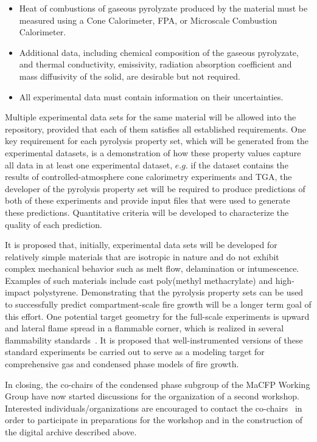 \begin{itemize}
\item Heat of combustions of gaseous pyrolyzate produced by the material must be measured using a Cone Calorimeter, FPA, or Microscale Combustion Calorimeter.
\item Additional data, including chemical composition of the gaseous pyrolyzate, and thermal conductivity, emissivity, radiation absorption coefficient and mass diffusivity of the solid, are desirable but not required.
\item All experimental data must contain information on their uncertainties.
\end{itemize}

Multiple experimental data sets for the same material will be allowed into the repository, provided that each of them satisfies all established requirements.  One key requirement for each pyrolysis property set, which will be generated from the experimental datasets, is a demonstration of how these property values capture all data in at least one experimental dataset, $e.g.$ if the dataset contains the results of controlled-atmosphere cone calorimetry experiments and TGA, the developer of the pyrolysis property set will be required to produce predictions of both of these experiments and provide input files that were used to generate these predictions.  Quantitative criteria will be developed to characterize the quality of each prediction. 

It is proposed that, initially, experimental data sets will be developed for relatively simple materials that are isotropic in nature and do not exhibit complex mechanical behavior such as melt flow, delamination or intumescence.  Examples of such materials include cast poly(methyl methacrylate) and high-impact polystyrene.  Demonstrating that the pyrolysis property sets can be used to successfully predict compartment-scale fire growth will be a longer term goal of this effort.  One potential target geometry for the full-scale experiments is upward and lateral flame spread in a flammable corner, which is realized in several flammability standards~\cite{NFPA,EN,ISO}.  It is proposed that well-instrumented versions of these standard experiments be carried out to serve as a modeling target for comprehensive gas and condensed phase models of fire growth.

In closing, the co-chairs of the condensed phase subgroup of the MaCFP Working Group have now started discussions for the organization of a second workshop. Interested individuals/organizations are encouraged to contact the co-chairs~\cite{MaCFP_website} in order to participate in preparations for the workshop and in the construction of the digital archive described above.
